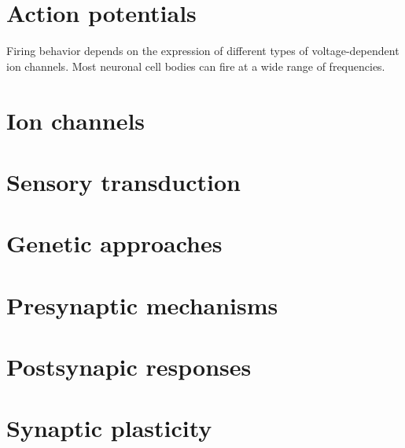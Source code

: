 

\section{Action potentials}

Firing behavior depends on the expression of different types of voltage-dependent ion channels. 
Most neuronal cell bodies can fire at a wide range of frequencies. 

\section{Ion channels}
\section{Sensory transduction}
\section{Genetic approaches}
\section{Presynaptic mechanisms}
\section{Postsynapic responses}
\section{Synaptic plasticity}



